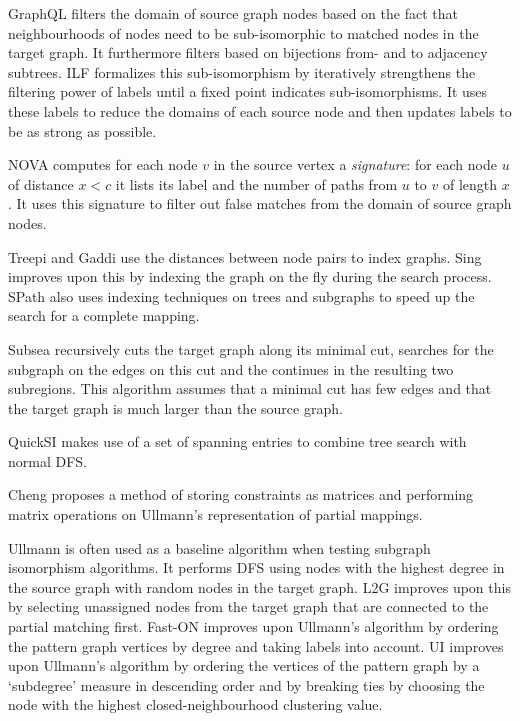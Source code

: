 GraphQL\cite{graphql} filters the domain of source graph nodes based on the fact that neighbourhoods of nodes need to be sub-isomorphic to matched nodes in the target graph. It furthermore filters based on bijections from- and to adjacency subtrees. ILF \cite{Zampelli2010} formalizes this sub-isomorphism by iteratively strengthens the filtering power of labels until a fixed point indicates sub-isomorphisms. It uses these labels to reduce the domains of each source node and then updates labels to be as strong as possible.


NOVA\cite{Zhu2010140} computes for each node $v$ in the source vertex a \textit{signature}: for each node $u$ of distance $x < c$ it lists its label and the number of paths from $u$ to $v$ of length $x$. It uses this signature to filter out false matches from the domain of source graph nodes.

Treepi\cite{Zhang2007} and Gaddi\cite{gaddi} use the distances between node pairs to index graphs. Sing\cite{DiNatale2010} improves upon this by indexing the graph on the fly during the search process. SPath\cite{spath} also uses indexing techniques on trees and subgraphs to speed up the search for a complete mapping.

Subsea\cite{Lipets2009320} recursively cuts the target graph along its minimal cut, searches for the subgraph on the edges on this cut and the continues in the resulting two subregions. This algorithm assumes that a minimal cut has few edges and that the target graph is much larger than the source graph.

QuickSI\cite{QuickSI} makes use of a set of spanning entries to combine tree search with normal DFS.

Cheng\cite{CHENG1981371} proposes a method of storing constraints as matrices and performing matrix operations on Ullmann's\cite{ullmann1976} representation of partial mappings.

Ullmann\cite{ullmann1976} is often used as a baseline algorithm when testing subgraph isomorphism algorithms. It performs DFS using nodes with the highest degree in the source graph with random nodes in the target graph. L2G\cite{Almasri2015} improves upon this by selecting unassigned nodes from the target graph that are connected to the partial matching first. Fast-ON\cite{Gouda2012} improves upon Ullmann's algorithm by ordering the pattern graph vertices by degree and taking labels into account. UI\cite{Cibej2014} improves upon Ullmann's algorithm\cite{ullmann1976} by ordering the vertices of the pattern graph by a `subdegree' measure in descending order and by breaking ties by choosing the node with the highest closed-neighbourhood clustering value.

